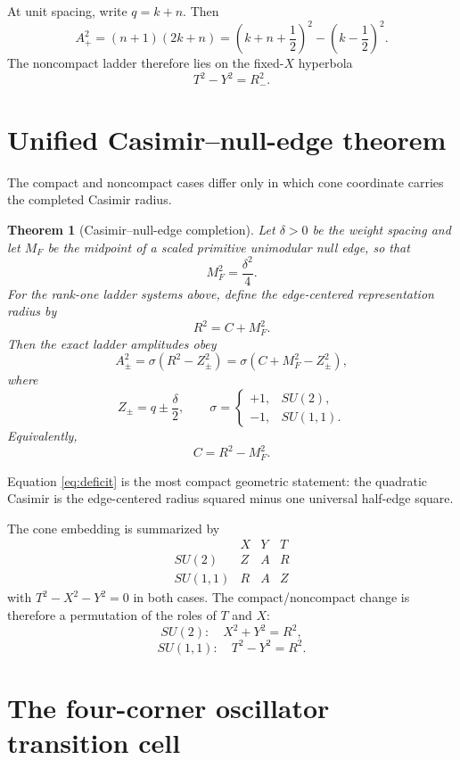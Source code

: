 \documentclass[11pt]{article}
\newtheorem{theorem}{Theorem}[section]
\theoremstyle{remark}
\begin{document}
At unit spacing, write $q=k+n$.  Then
\[
A_+^2
=
(n+1)(2k+n)
=
\left(k+n+\frac12\right)^2
-
\left(k-\frac12\right)^2.
\]
The noncompact ladder therefore lies on the fixed-$X$ hyperbola
\[
T^2-Y^2=R_-^2.
\]

\section{Unified Casimir--null-edge theorem}

The compact and noncompact cases differ only in which cone coordinate carries the completed Casimir radius.

\begin{theorem}[Casimir--null-edge completion]
\label{thm:unified}
Let $\delta>0$ be the weight spacing and let $M_F$ be the midpoint of a scaled primitive unimodular null edge, so that
\[
M_F^2=\frac{\delta^2}{4}.
\]
For the rank-one ladder systems above, define the edge-centered representation radius by
\[
R^2=C+M_F^2.
\]
Then the exact ladder amplitudes obey
\begin{equation}
\boxed{
A_\pm^2
=
\sigma\left(R^2-Z_\pm^2\right)
=
\sigma\left(C+M_F^2-Z_\pm^2\right),
}
\label{eq:unified}
\end{equation}
where
\[
Z_\pm=q\pm\frac{\delta}{2},
\qquad
\sigma=
\begin{cases}
+1,&SU(2),\\
-1,&SU(1,1).
\end{cases}
\]
Equivalently,
\begin{equation}
\boxed{
C=R^2-M_F^2.
}
\label{eq:deficit}
\end{equation}
\end{theorem}

Equation \eqref{eq:deficit} is the most compact geometric statement: the quadratic Casimir is the edge-centered radius squared minus one universal half-edge square.

The cone embedding is summarized by
\[
\begin{array}{c|ccc}
&X&Y&T\\
\hline
SU(2)&Z&A&R\\
SU(1,1)&R&A&Z
\end{array}
\]
with $T^2-X^2-Y^2=0$ in both cases.  The compact/noncompact change is therefore a permutation of the roles of $T$ and $X$:
\[
SU(2):\quad X^2+Y^2=R^2,
\]
\[
SU(1,1):\quad T^2-Y^2=R^2.
\]

\section{The four-corner oscillator transition cell}
\end{document}
